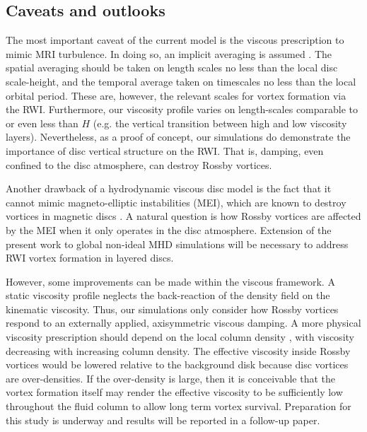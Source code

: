 \subsection{Caveats and outlooks}\label{caveats}

The most important caveat of the current model is the viscous
prescription to mimic MRI turbulence. In doing so, an implicit
averaging is assumed \citep{balbus99}. The spatial averaging should be
taken on length scales no less than the local disc scale-height, and
the temporal average taken on timescales no less than the local
orbital period. These are, however, the relevant scales for vortex
formation via the RWI. Furthermore, our viscosity profile varies on
length-scales comparable to or even less than $H$ (e.g. the vertical transition
between high and low viscosity layers). Nevertheless, as a proof of
concept, our simulations do demonstrate %
the importance of disc vertical structure on the RWI. That is, damping,
even confined to the disc atmosphere, can destroy Rossby vortices. 

Another drawback of a hydrodynamic viscous disc model is the
fact that it cannot mimic magneto-elliptic instabilities (MEI), which
are known to destroy vortices in magnetic discs
\citep{lyra11,mizerski12}. A natural question is how 
Rossby vortices are affected by the MEI when it only operates in
the disc atmosphere. Extension of the present work to global non-ideal
MHD simulations will be necessary to address RWI vortex formation in
layered discs.   

However, some improvements can be made within the viscous
framework. A static viscosity profile neglects the
back-reaction of the density field on the kinematic viscosity. Thus,
our simulations only consider how Rossby vortices 
respond to an externally applied, axisymmetric viscous damping. A more
physical viscosity prescription should depend on the local column density
\citep{fleming03}, with viscosity decreasing with increasing column
density. The effective viscosity inside Rossby vortices would be
lowered relative to the background disk because disc vortices are
over-densities. If the over-density is large, then it is
conceivable that the vortex formation itself may render the effective
viscosity to be sufficiently low throughout the fluid column to allow
long term vortex survival.    
Preparation for this study is underway and results will be reported in
a follow-up paper. 

